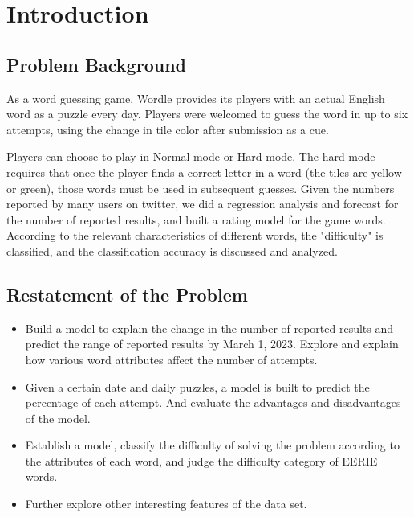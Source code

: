 \documentclass{mcmthesis}
\begin{document}
\maketitle
\begin{spacing}{0.3}
	\tableofcontents
\end{spacing}
 \newpage


\section{Introduction}
\subsection{Problem Background}

As a word guessing game, Wordle provides its players with an actual English word as a puzzle every day. Players were welcomed to guess the word in up to six attempts, using the change in tile color after submission as a cue.

Players can choose to play in Normal mode or Hard mode. The hard mode requires that once the player finds a correct letter in a word (the tiles are yellow or green), those words must be used in subsequent guesses. Given the numbers reported by many users on twitter, we did a regression analysis and forecast for the number of reported results, and built a rating model for the game words. According to the relevant characteristics of different words, the "difficulty" is classified, and the classification accuracy is discussed and analyzed.

\subsection{Restatement of the Problem}
\begin{itemize}
	\item Build a model to explain the change in the number of reported results and predict the range of reported results by March 1, 2023. Explore and explain how various word attributes affect the number of attempts.
	\item Given a certain date and daily puzzles, a model is built to predict the percentage of each attempt. And evaluate the advantages and disadvantages of the model.
	\item Establish a model, classify the difficulty of solving the problem according to the attributes of each word, and judge the difficulty category of EERIE words.
	\item Further explore other interesting features of the data set.
\end{itemize}
\end{document}
